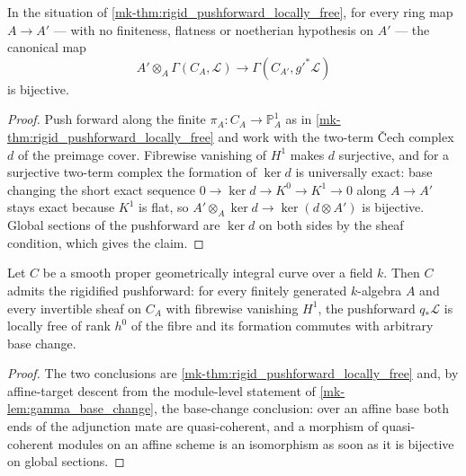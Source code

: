 \begin{lemma}\label{mk-lem:gamma_base_change}
  \leanok

  In the situation of \ref{mk-thm:rigid_pushforward_locally_free}, for every ring
  map \(A \to A'\) --- with no finiteness, flatness or noetherian hypothesis on
  \(A'\) --- the canonical map
  \[
    A' \otimes_A \Gamma(C_A, \mathcal{L})
      \longrightarrow \Gamma(C_{A'}, g'^* \mathcal{L})
  \]
  is bijective.
\end{lemma}

\begin{proof}
  \leanok{}
  Push forward along the finite \(\pi_A : C_A \to \mathbb{P}^1_A\) as in
  \ref{mk-thm:rigid_pushforward_locally_free} and work with the two-term {\v C}ech
  complex \(d\) of the preimage cover. Fibrewise vanishing of \(H^1\) makes \(d\)
  surjective, and for a surjective two-term complex the formation of \(\ker d\)
  is universally exact: base changing the short exact sequence
  \(0 \to \ker d \to K^0 \to K^1 \to 0\) along \(A \to A'\) stays exact because
  \(K^1\) is flat, so \(A' \otimes_A \ker d \to \ker(d \otimes A')\) is
  bijective. Global sections of the pushforward are \(\ker d\) on both sides by
  the sheaf condition, which gives the claim.
\end{proof}

\begin{theorem}\label{mk-thm:rigid_pushforward_gate}
  \leanok

  Let \(C\) be a smooth proper geometrically integral curve over a field \(k\).
  Then \(C\) admits the rigidified pushforward: for every finitely generated
  \(k\)-algebra \(A\) and every invertible sheaf on \(C_A\) with fibrewise
  vanishing \(H^1\), the pushforward \(q_* \mathcal{L}\) is locally free of rank
  \(h^0\) of the fibre and its formation commutes with arbitrary base change.
\end{theorem}

\begin{proof}
  \leanok{}
  The two conclusions are \ref{mk-thm:rigid_pushforward_locally_free} and, by
  affine-target descent from the module-level statement of
  \ref{mk-lem:gamma_base_change}, the base-change conclusion: over an affine base
  both ends of the adjunction mate are quasi-coherent, and a morphism of
  quasi-coherent modules on an affine scheme is an isomorphism as soon as it is
  bijective on global sections.
\end{proof}

